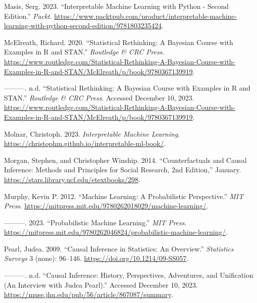 \documentclass[
  letterpaper,
]{krantz}
\newlength{\cslhangindent}
\newlength{\cslentryspacingunit} %
\newenvironment{CSLReferences}[2] %
 {%
  \setlength{\parindent}{0pt}
  \ifodd #1
  \let\oldpar\par
  \def\par{\hangindent=\cslhangindent\oldpar}
  \fi
  \setlength{\parskip}{#2\cslentryspacingunit}
 }%
 {}
\begin{document}
\begin{CSLReferences}{1}{0}
\leavevmode{}%
Masis, Serg. 2023. {``Interpretable {Machine} {Learning} with {Python} -
{Second} {Edition}.''} \emph{Packt}.
\url{https://www.packtpub.com/product/interpretable-machine-learning-with-python-second-edition/9781803235424}.

\leavevmode{}%
McElreath, Richard. 2020. {``Statistical {Rethinking}: {A} {Bayesian}
{Course} with {Examples} in {R} and {STAN}.''} \emph{Routledge \& CRC
Press}.
\url{https://www.routledge.com/Statistical-Rethinking-A-Bayesian-Course-with-Examples-in-R-and-STAN/McElreath/p/book/9780367139919}.

\leavevmode{}%
---------. n.d. {``Statistical {Rethinking}: {A} {Bayesian} {Course}
with {Examples} in {R} and {STAN}.''} \emph{Routledge \& CRC Press}.
Accessed December 10, 2023.
\url{https://www.routledge.com/Statistical-Rethinking-A-Bayesian-Course-with-Examples-in-R-and-STAN/McElreath/p/book/9780367139919}.

\leavevmode{}%
Molnar, Christoph. 2023. \emph{Interpretable {Machine} {Learning}}.
\url{https://christophm.github.io/interpretable-ml-book/}.

\leavevmode{}%
Morgan, Stephen, and Christopher Winship. 2014. {``Counterfactuals and
{Causal} {Inference}: {Methods} and {Principles} for {Social}
{Research}, 2nd {Edition},''} January.
\url{https://stars.library.ucf.edu/etextbooks/298}.

\leavevmode{}%
Murphy, Kevin P. 2012. {``Machine {Learning}: {A} {Probabilistic}
{Perspective}.''} \emph{MIT Press}.
\url{https://mitpress.mit.edu/9780262018029/machine-learning/}.

\leavevmode{}%
---------. 2023. {``Probabilistic {Machine} {Learning}.''} \emph{MIT
Press}.
\url{https://mitpress.mit.edu/9780262046824/probabilistic-machine-learning/}.

\leavevmode{}%
Pearl, Judea. 2009. {``Causal Inference in Statistics: {An} Overview.''}
\emph{Statistics Surveys} 3 (none): 96--146.
\url{https://doi.org/10.1214/09-SS057}.

\leavevmode{}%
---------. n.d. {``Causal {Inference}: {History}, {Perspectives},
{Adventures}, and {Unification} ({An} {Interview} with {Judea}
{Pearl}).''} Accessed December 10, 2023.
\url{https://muse.jhu.edu/pub/56/article/867087/summary}.


\end{CSLReferences}
\end{document}
